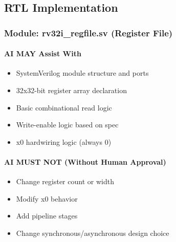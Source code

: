 \subsection{RTL Implementation}\label{cr:status:phase1-ai-human-responsibilities:rtl-implementation}

\subsubsection{\texorpdfstring{Module: rv32i\_\allowbreak{}regfile.sv
(Register File)}{Module: rv32i\_regfile.sv (Register File)}}\label{cr:status:phase1-ai-human-responsibilities:module-rv32i-regfilesv-register-file}

\paragraph{\texorpdfstring{\ok{} AI MAY Assist
With}{ AI MAY Assist With}}\label{cr:status:phase1-ai-human-responsibilities:white-check-mark-ai-may-assist-with}

\begin{record}

\begin{itemize}
\tightlist
\item
  SystemVerilog module structure and ports
\item
  32x32-bit register array declaration
\item
  Basic combinational read logic
\item
  Write-enable logic based on spec
\item
  x0 hardwiring logic (always 0)
\end{itemize}

\end{record}

\paragraph{\texorpdfstring{\warn{} AI MUST NOT (Without Human
Approval)}{ AI MUST NOT (Without Human Approval)}}\label{cr:status:phase1-ai-human-responsibilities:warning-ai-must-not-without-human-approval}

\begin{record}

\begin{itemize}
\tightlist
\item
  Change register count or width
\item
  Modify x0 behavior
\item
  Add pipeline stages
\item
  Change synchronous/\allowbreak{}asynchronous design choice
\end{itemize}

\end{record}

